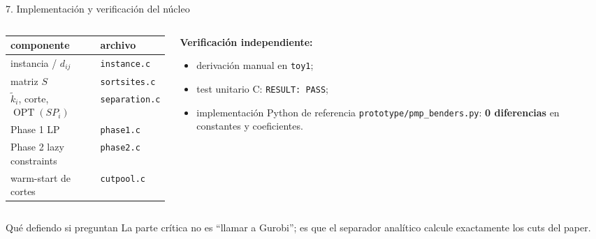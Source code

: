 \documentclass[10pt,aspectratio=169]{beamer}
\DeclareMathOperator*{\OPT}{OPT}
\newcommand{\kt}{\tilde{k}}
\begin{document}
\begin{frame}{7. Implementación y verificación del núcleo}
\begin{columns}
\begin{column}{0.50\textwidth}
\small
\begin{tabular}{ll}
\toprule
componente & archivo \\
\midrule
instancia / $d_{ij}$ & \texttt{instance.c} \\
matriz $S$ & \texttt{sortsites.c} \\
$\kt_i$, corte, $\OPT(SP_i)$ & \texttt{separation.c} \\
Phase 1 LP & \texttt{phase1.c} \\
Phase 2 lazy constraints & \texttt{phase2.c} \\
warm-start de cortes & \texttt{cutpool.c} \\
\bottomrule
\end{tabular}
\end{column}
\begin{column}{0.47\textwidth}
\textbf{Verificación independiente:}
\begin{itemize}
  \item derivación manual en \texttt{toy1};
  \item test unitario C: \texttt{RESULT: PASS};
  \item implementación Python de referencia \texttt{prototype/pmp\_benders.py}: \textbf{0 diferencias} en constantes y coeficientes.
\end{itemize}
\end{column}
\end{columns}
\vfill
\begin{block}{Qué defiendo si preguntan}
La parte crítica no es “llamar a Gurobi”; es que el separador analítico calcule exactamente los cuts del paper.
\end{block}
\end{frame}
\end{document}
